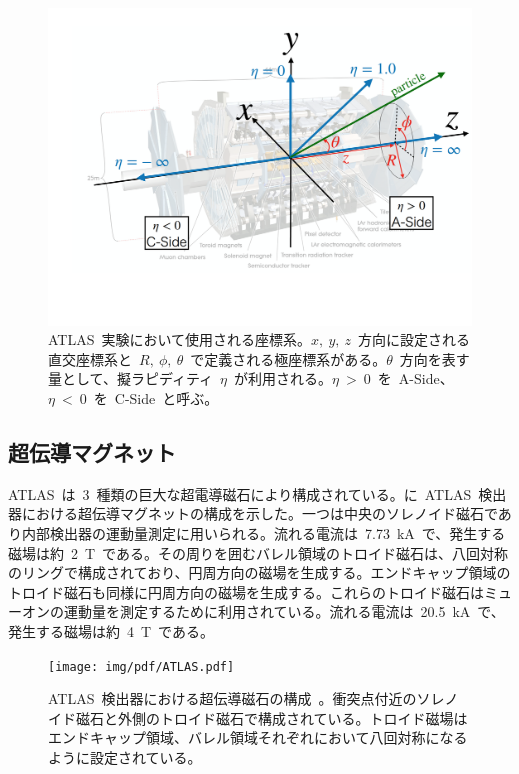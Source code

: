 \begin{figure}[H]
    \centering  
    \includegraphics[width=\textwidth,page=1]{img/pdf/cood.pdf}
    \caption[ATLAS~実験において使用される座標系]{ATLAS~実験において使用される座標系。$x,~y,~z$~方向に設定される直交座標系と~$R,~\phi,~\theta$~で定義される極座標系がある。$\theta$~方向を表す量として、擬ラピディティ~$\eta$~が利用される。$\eta~>~0$~を~A-Side、$\eta~<~0$~を~C-Side~と呼ぶ。}\label{fig:cood}
\end{figure}

\subsection{超伝導マグネット}
ATLAS~は~3~種類の巨大な超電導磁石により構成されている。に~ATLAS~検出器における超伝導マグネットの構成を示した。一つは中央のソレノイド磁石であり内部検出器の運動量測定に用いられる。流れる電流は~7.73~kA~で、発生する磁場は約~2~T~である。その周りを囲むバレル領域のトロイド磁石は、八回対称のリングで構成されており、円周方向の磁場を生成する。エンドキャップ領域のトロイド磁石も同様に円周方向の磁場を生成する。これらのトロイド磁石はミューオンの運動量を測定するために利用されている。流れる電流は~20.5~kA~で、発生する磁場は約~4~T~である。

\begin{figure}[H]
        \centering   
        \texttt{[image: img/pdf/ATLAS.pdf]}
        \caption[ATLAS~検出器における超伝導磁石の構成]{ATLAS~検出器における超伝導磁石の構成~\cite{TR:01}。衝突点付近のソレノイド磁石と外側のトロイド磁石で構成されている。トロイド磁場はエンドキャップ領域、バレル領域それぞれにおいて八回対称になるように設定されている。}\label{fig:mag}
\end{figure}


